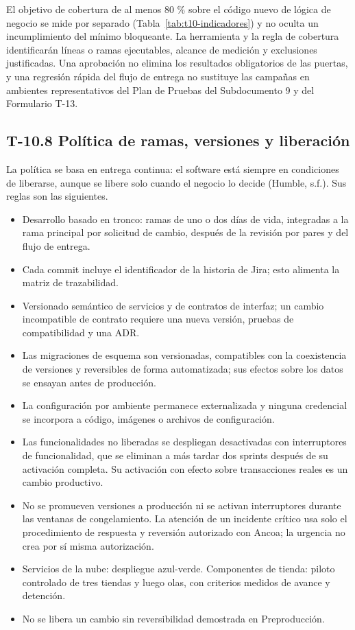 \documentclass[11pt]{article}
\providecommand{\tightlist}{%
  \setlength{\itemsep}{0pt}\setlength{\parskip}{0pt}}
\begin{document}
El objetivo de cobertura de al menos 80 \% sobre el código nuevo de lógica de negocio se mide por separado (Tabla~\mbox{\ref{tab:t10-indicadores}}) y no oculta un incumplimiento del mínimo bloqueante. La herramienta y la regla de cobertura identificarán líneas o ramas ejecutables, alcance de medición y exclusiones justificadas. Una aprobación no elimina los resultados obligatorios de las puertas, y una regresión rápida del flujo de entrega no sustituye las campañas en ambientes representativos del Plan de Pruebas del Subdocumento 9 y del Formulario T-13.

\subsection{T-10.8 Política de ramas, versiones y liberación}\label{t10-8}

La política se basa en entrega continua: el software está siempre en condiciones de liberarse, aunque se libere solo cuando el negocio lo decide (Humble, s.f.). Sus reglas son las siguientes.

\begin{itemize}
\tightlist
\item
  Desarrollo basado en tronco: ramas de uno o dos días de vida, integradas a la rama principal por solicitud de cambio, después de la revisión por pares y del flujo de entrega.
\item
  Cada commit incluye el identificador de la historia de Jira; esto alimenta la matriz de trazabilidad.
\item
  Versionado semántico de servicios y de contratos de interfaz; un cambio incompatible de contrato requiere una nueva versión, pruebas de compatibilidad y una ADR.
\item
  Las migraciones de esquema son versionadas, compatibles con la coexistencia de versiones y reversibles de forma automatizada; sus efectos sobre los datos se ensayan antes de producción.
\item
  La configuración por ambiente permanece externalizada y ninguna credencial se incorpora a código, imágenes o archivos de configuración.
\item
  Las funcionalidades no liberadas se despliegan desactivadas con interruptores de funcionalidad, que se eliminan a más tardar dos sprints después de su activación completa. Su activación con efecto sobre transacciones reales es un cambio productivo.
\item
  No se promueven versiones a producción ni se activan interruptores durante las ventanas de congelamiento. La atención de un incidente crítico usa solo el procedimiento de respuesta y reversión autorizado con Ancoa; la urgencia no crea por sí misma autorización.
\item
  Servicios de la nube: despliegue azul-verde. Componentes de tienda: piloto controlado de tres tiendas y luego olas, con criterios medidos de avance y detención.
\item
  No se libera un cambio sin reversibilidad demostrada en Preproducción.
\end{itemize}
\end{document}
